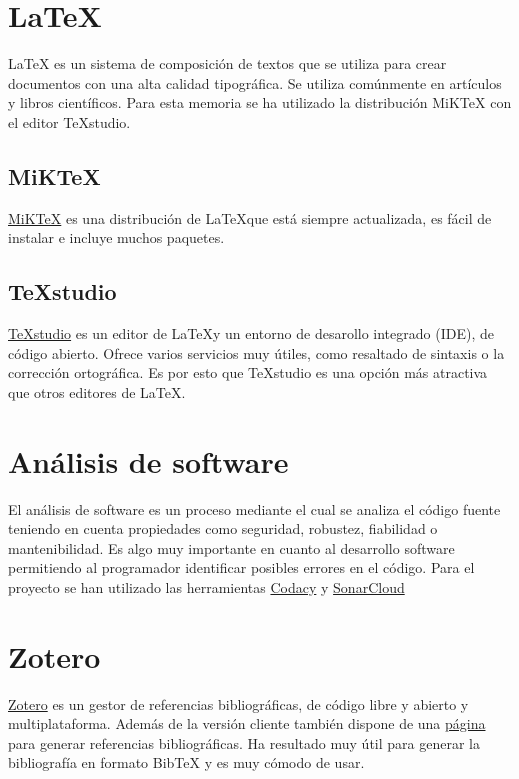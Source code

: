 \section{\LaTeX}

\LaTeX \cite{LaTeX2020} es un sistema de composición de textos que se utiliza para crear documentos con una alta calidad tipográfica. Se utiliza comúnmente en artículos y libros científicos. Para esta memoria se ha utilizado la distribución MiKTeX con el editor TeXstudio.

\subsection{MiKTeX}

\href{https://miktex.org/}{MiKTeX} es una distribución de \LaTeX que está siempre actualizada, es fácil de instalar e incluye muchos paquetes.

\subsection{TeXstudio}

\href{https://www.texstudio.org/}{TeXstudio} \cite{TeXstudio2019} es un editor de \LaTeX y un entorno de desarollo integrado (IDE), de código abierto. Ofrece varios servicios muy útiles, como resaltado de sintaxis o la corrección ortográfica. Es por esto que TeXstudio es una opción más atractiva que otros editores de \LaTeX.

\section{Análisis de software}

El análisis de software\cite{AnalisisSoftware2019} es un proceso mediante el cual se analiza el código fuente teniendo en cuenta propiedades como seguridad, robustez, fiabilidad o mantenibilidad. Es algo muy importante en cuanto al desarrollo software permitiendo al programador identificar posibles errores en el código. Para el proyecto se han utilizado las herramientas \href{https://app.codacy.com/}{Codacy} y \href{https://sonarcloud.io/}{SonarCloud}


\section{Zotero}

\href{https://www.zotero.org/}{Zotero} \cite{Zotero2020} es un gestor de referencias bibliográficas, de código libre y abierto y multiplataforma. Además de la versión cliente también dispone de una \href{https://zbib.org/}{página} para generar referencias bibliográficas. Ha resultado muy útil para generar la bibliografía en formato BibTeX y es muy cómodo de usar.

